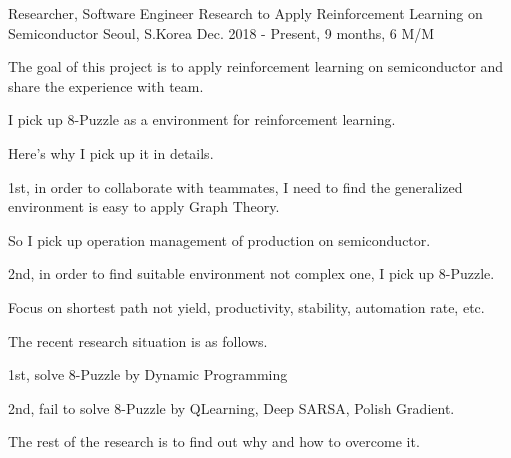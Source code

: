 \begin{cventries}
  \cventry
    {Researcher, Software Engineer} %
    {Research to Apply Reinforcement Learning on Semiconductor} %
    {Seoul, S.Korea} %
    {Dec. 2018 - Present, 9 months, 6 M/M} %
    {
      \begin{cvitems} %
        \item {The goal of this project is to apply reinforcement learning on semiconductor and share the experience with team.}
        \item {I pick up 8-Puzzle as a environment for reinforcement learning.}
        \item {Here's why I pick up it in details.}
        \item {1st, in order to collaborate with teammates, I need to find the generalized environment is easy to apply Graph Theory.}
        \item {So I pick up operation management of production on semiconductor.}
        \item {2nd, in order to find suitable environment not complex one, I pick up 8-Puzzle.}
        \item {Focus on shortest path not yield, productivity, stability, automation rate, etc.}
        \item {The recent research situation is as follows.}
        \item {1st, solve 8-Puzzle by Dynamic Programming}
        \item {2nd, fail to solve 8-Puzzle by QLearning, Deep SARSA, Polish Gradient.}
        \item {The rest of the research is to find out why and how to overcome it.}
      \end{cvitems}
    }


\end{cventries}
